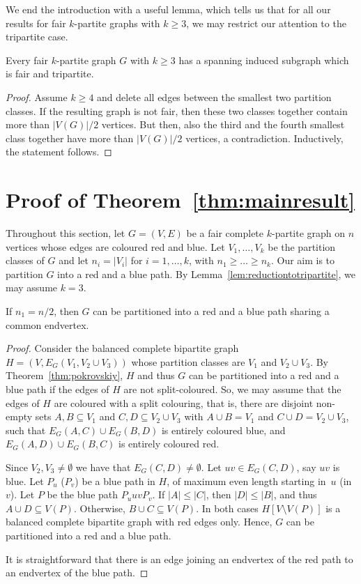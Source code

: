 \documentclass[a4paper,10pt]{article}
\begin{document}
We end the introduction with a useful lemma, which tells us that for all our results for fair $k$-partite graphs with $k\geq 3$, we may restrict our attention to the tripartite case.

\begin{lemma}\label{lem:reductiontotripartite}
Every fair $k$-partite graph $G$ with $k \ge 3$ has a spanning induced subgraph which is fair and tripartite.
\end{lemma}
\begin{proof}
Assume $k \ge 4$ and delete all edges between the smallest two partition classes. If the resulting graph is not fair, then these two classes together contain more than $|V(G)|/2$ vertices. But then, also the third and the fourth smallest class together have more than $|V(G)|/2$ vertices, a contradiction. Inductively, the statement follows.
\end{proof}

\section{Proof of Theorem~\ref{thm:mainresult}}\label{sec:paths}

Throughout this section, let $G=(V,E)$ be a fair complete $k$-partite graph on $n$ vertices whose edges are coloured red and blue.
Let $V_1, \ldots , V_k$ be the partition classes of $G$ and let $n_i = |V_i|$ for $i = 1,\ldots,k$, with $n_1 \ge \ldots \ge n_k$.
Our aim is to partition $G$ into a red and a blue path.
By Lemma~\ref{lem:reductiontotripartite}, we may assume $k=3$.

\begin{lemma}\label{lem:equality-case}
If  $n_1=n/2$, then $G$ can be partitioned into a red and a blue path sharing a common endvertex.
\end{lemma}
\begin{proof}
Consider the balanced complete bipartite graph $H=(V,E_G(V_1,V_2 \cup V_3))$ whose partition classes are $V_1$ and $V_2 \cup V_3$.
By Theorem~\ref{thm:pokrovskiy}, $H$ and thus $G$ can be partitioned into a red and a blue path if the edges of $H$ are not split-coloured.
So, we may assume that the edges of $H$ are coloured with a split colouring, that is, there are disjoint non-empty sets $A,B \subseteq V_1$ and $C,D \subseteq V_2 \cup V_3$ with $A \cup B = V_1$ and $C \cup D = V_2 \cup V_3$, such that $E_G(A,C) \cup E_G(B,D)$ is entirely coloured blue, and $E_G(A,D) \cup E_G(B,C)$ is entirely coloured red.

Since $V_2, V_3\neq\emptyset$ we have that $E_G(C,D) \neq \emptyset$.
Let $uv \in E_G(C,D)$, say $uv$ is blue.
Let $P_u$ ($P_v$) be a blue path in $H$, of maximum even length starting in~$u$ (in $v$). 
Let $P$ be the blue path $P_u uv P_v$.
If $|A| \le |C|$, then $|D| \le |B|$, and thus $A \cup D \subseteq V(P)$.
Otherwise, $B \cup C \subseteq V(P)$.
In both cases $H[V \setminus V(P)]$ is a balanced complete bipartite graph with red edges only.
Hence, $G$ can be partitioned into a red and a blue path.

It is straightforward that there is an edge joining an endvertex of the red path to an endvertex of the blue path.
\end{proof}
\end{document}
